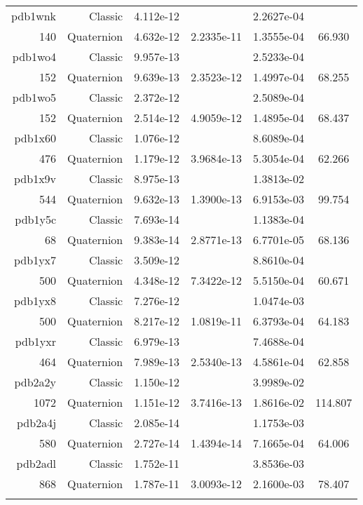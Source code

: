 \begin{xltabular}{\textwidth}{r|rS[table-format=1.3e+2]S[table-format=1.4e+2]S[table-format=1.4e+2]S[table-format=-1.3]}
pdb1wnk & Classic & 4.112e-12 &  & 2.2627e-04 & \\
140 & Quaternion & 4.632e-12 & 2.2335e-11 & 1.3555e-04 & 66.930\\  \addlinespace
pdb1wo4 & Classic & 9.957e-13 &  & 2.5233e-04 & \\
152 & Quaternion & 9.639e-13 & 2.3523e-12 & 1.4997e-04 & 68.255\\  \addlinespace
pdb1wo5 & Classic & 2.372e-12 &  & 2.5089e-04 & \\
152 & Quaternion & 2.514e-12 & 4.9059e-12 & 1.4895e-04 & 68.437\\  \addlinespace
pdb1x60 & Classic & 1.076e-12 &  & 8.6089e-04 & \\
476 & Quaternion & 1.179e-12 & 3.9684e-13 & 5.3054e-04 & 62.266\\  \addlinespace
pdb1x9v & Classic & 8.975e-13 &  & 1.3813e-02 & \\
544 & Quaternion & 9.632e-13 & 1.3900e-13 & 6.9153e-03 & 99.754\\  \addlinespace
pdb1y5c & Classic & 7.693e-14 &  & 1.1383e-04 & \\
68 & Quaternion & 9.383e-14 & 2.8771e-13 & 6.7701e-05 & 68.136\\  \addlinespace
pdb1yx7 & Classic & 3.509e-12 &  & 8.8610e-04 & \\
500 & Quaternion & 4.348e-12 & 7.3422e-12 & 5.5150e-04 & 60.671\\  \addlinespace
pdb1yx8 & Classic & 7.276e-12 &  & 1.0474e-03 & \\
500 & Quaternion & 8.217e-12 & 1.0819e-11 & 6.3793e-04 & 64.183\\  \addlinespace
pdb1yxr & Classic & 6.979e-13 &  & 7.4688e-04 & \\
464 & Quaternion & 7.989e-13 & 2.5340e-13 & 4.5861e-04 & 62.858\\  \addlinespace
pdb2a2y & Classic & 1.150e-12 &  & 3.9989e-02 & \\
1072 & Quaternion & 1.151e-12 & 3.7416e-13 & 1.8616e-02 & 114.807\\  \addlinespace
pdb2a4j & Classic & 2.085e-14 &  & 1.1753e-03 & \\
580 & Quaternion & 2.727e-14 & 1.4394e-14 & 7.1665e-04 & 64.006\\  \addlinespace
pdb2adl & Classic & 1.752e-11 &  & 3.8536e-03 & \\
868 & Quaternion & 1.787e-11 & 3.0093e-12 & 2.1600e-03 & 78.407\\  \addlinespace

\end{xltabular}
